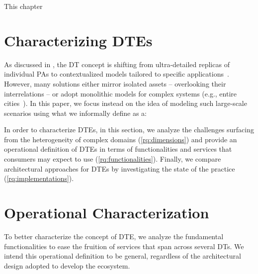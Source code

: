 
This chapter



\section{Characterizing \aclp{DTE}}
\label{sec:ecosystems}

As discussed in , the \ac{DT} concept is shifting from ultra-detailed replicas of individual \acp{PA} to contextualized models tailored to specific applications~\cite{minerva2020dtiot}.
%
However, many solutions either mirror isolated assets -- overlooking their interrelations -- or adopt monolithic models for complex systems (e.g., entire cities~\cite{Deren2021}).
%
In this paper, we focus instead on the idea of modeling such large-scale scenarios using what we informally define as a:


In order to characterize \acp{DTE}, in this section,
we analyze the challenges surfacing from the heterogeneity of complex domains (\ref{rq:dimensions})
and provide an operational definition of \acp{DTE} in terms of functionalities and services that consumers may expect to use (\ref{rq:functionalities}).
Finally, we compare architectural approaches for \acp{DTE} by investigating the state of the practice (\ref{rq:implementations}).


\section{Operational Characterization}
\label{sec:operational-characterization}

To better characterize the concept of \ac{DTE}, we analyze the fundamental functionalities to ease the fruition of services that span across several \acp{DT}.
%
We intend this operational definition to be general, regardless of the architectural design adopted to develop the ecosystem.

